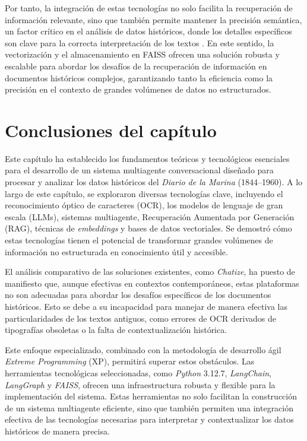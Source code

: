 Por tanto, la integración de estas tecnologías no solo facilita la recuperación de información relevante, sino que también permite mantener la precisión semántica, un factor crítico en el análisis de datos históricos, donde los detalles específicos son clave para la correcta interpretación de los textos \cite{mikolov2013efficient}. En este sentido, la vectorización y el almacenamiento en FAISS ofrecen una solución robusta y escalable para abordar los desafíos de la recuperación de información en documentos históricos complejos, garantizando tanto la eficiencia como la precisión en el contexto de grandes volúmenes de datos no estructurados.


\section*{Conclusiones del capítulo}

Este capítulo ha establecido los fundamentos teóricos y tecnológicos esenciales para el desarrollo de un sistema multiagente conversacional diseñado para procesar y analizar los datos históricos del \textit{Diario de la Marina} (1844--1960). A lo largo de este capítulo, se exploraron diversas tecnologías clave, incluyendo el reconocimiento óptico de caracteres (OCR), los modelos de lenguaje de gran escala (LLMs), sistemas multiagente, Recuperación Aumentada por Generación (RAG), técnicas de \textit{embeddings} y bases de datos vectoriales. Se demostró cómo estas tecnologías tienen el potencial de transformar grandes volúmenes de información no estructurada en conocimiento útil y accesible.

El análisis comparativo de las soluciones existentes, como \textit{Chatize}, ha puesto de manifiesto que, aunque efectivas en contextos contemporáneos, estas plataformas no son adecuadas para abordar los desafíos específicos de los documentos históricos. Esto se debe a su incapacidad para manejar de manera efectiva las particularidades de los textos antiguos, como errores de OCR derivados de tipografías obsoletas o la falta de contextualización histórica.

Este enfoque especializado, combinado con la metodología de desarrollo ágil \textit{Extreme Programming} (XP), permitirá superar estos obstáculos. Las herramientas tecnológicas seleccionadas, como \textit{Python} 3.12.7, \textit{LangChain}, \textit{LangGraph} y \textit{FAISS}, ofrecen una infraestructura robusta y flexible para la implementación del sistema. Estas herramientas no solo facilitan la construcción de un sistema multiagente eficiente, sino que también permiten una integración efectiva de las tecnologías necesarias para interpretar y contextualizar los datos históricos de manera precisa.
